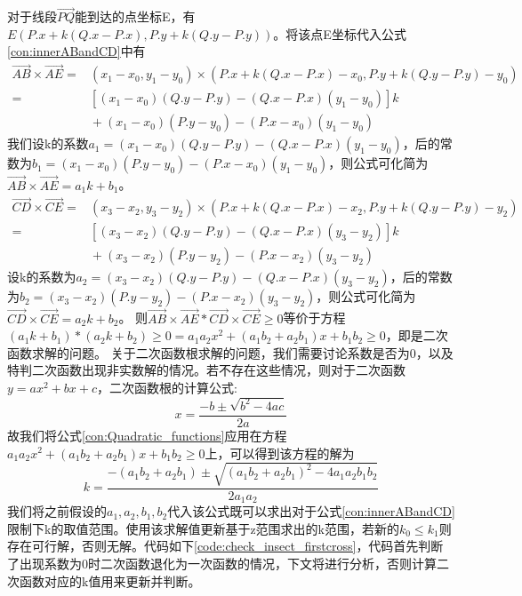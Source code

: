 
对于线段$\vec{PQ}$能到达的点坐标E，有$E(P.x+k(Q.x-P.x),P.y+k(Q.y-P.y))$。将该点E坐标代入公式\ref{con:innerABandCD}中有
\begin{align*} 
    \vec{AB}\times\vec{AE} = {}& (x_1-x_0,y_1-y_0)\times(P.x+k(Q.x-P.x)-x_0,P.y+k(Q.y-P.y)-y_0) \\ 
    = {}& [(x_1-x_0)(Q.y-P.y)-(Q.x-P.x)(y_1-y_0)]k  \\ 
    &{} +(x_1-x_0)(P.y-y_0)-(P.x-x_0)(y_1-y_0) 
\end{align*}
我们设k的系数$a_1=(x_1-x_0)(Q.y-P.y)-(Q.x-P.x)(y_1-y_0)$，后的常数为$b_1=(x_1-x_0)(P.y-y_0)-(P.x-x_0)(y_1-y_0)$，则公式可化简为$\vec{AB}\times\vec{AE} = a_1k+b_1$。
\begin{align*} 
    \vec{CD}\times\vec{CE} = {}& (x_3-x_2,y_3-y_2)\times(P.x+k(Q.x-P.x)-x_2,P.y+k(Q.y-P.y)-y_2) \\ 
    = {}& [(x_3-x_2)(Q.y-P.y)-(Q.x-P.x)(y_3-y_2)]k  \\ 
    &{} +(x_3-x_2)(P.y-y_2)-(P.x-x_2)(y_3-y_2) 
\end{align*}
设k的系数为$a_2=(x_3-x_2)(Q.y-P.y)-(Q.x-P.x)(y_3-y_2)$，后的常数为$b_2=(x_3-x_2)(P.y-y_2)-(P.x-x_2)(y_3-y_2)$，则公式可化简为$\vec{CD}\times\vec{CE} = a_2k+b_2$。
则$\vec{AB}\times\vec{AE}*\vec{CD}\times\vec{CE}\ge 0$等价于方程$(a_1k+b_1)*(a_2k+b_2) \ge 0 = a_1a_2x^2+(a_1b_2+a_2b_1)x+b_1b_2 \ge 0$，即是二次函数求解的问题。
关于二次函数根求解的问题，我们需要讨论系数是否为0，以及特判二次函数出现非实数解的情况。若不存在这些情况，则对于二次函数$y=ax^2+bx+c$，二次函数根的计算公式:
\begin{equation}
    x=\dfrac{-b\pm\sqrt{b^2-4ac}}{2a}
\label{con:Quadratic_functions}
\end{equation}
故我们将公式\ref{con:Quadratic_functions}应用在方程$a_1a_2x^2+(a_1b_2+a_2b_1)x+b_1b_2 \ge 0$上，可以得到该方程的解为
\begin{equation}
    k=\dfrac{-(a_1b_2+a_2b_1)\pm\sqrt{(a_1b_2+a_2b_1)^2-4a_1a_2b_1b_2}}{2a_1a_2}
\label{con:kBaseOnQuadFun}
\end{equation}
我们将之前假设的$a_1,a_2,b_1,b_2$代入该公式既可以求出对于公式\ref{con:innerABandCD}限制下k的取值范围。使用该求解值更新基于z范围求出的k范围，若新的$k_0\leq k_1$则存在可行解，否则无解。代码如下\ref{code:check_insect_firstcross}，代码首先判断了出现系数为0时二次函数退化为一次函数的情况，下文将进行分析，否则计算二次函数对应的k值用来更新并判断。

